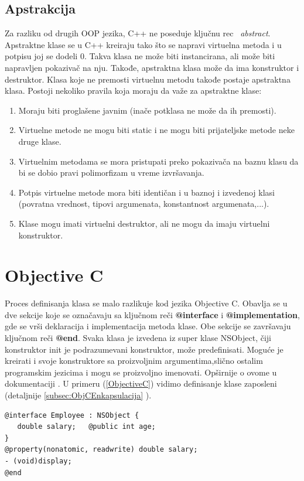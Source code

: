 \documentclass[a4paper]{article}
\begin{document}
{\subsection{Apstrakcija}
\label{subsec:c++Apstrakcija}
Za razliku od drugih OOP jezika, C++ ne poseduje ključnu rec ~{\em abstract}. Apstraktne klase se u C++ kreiraju tako što se napravi virtuelna metoda i u potpisu joj se dodeli 0. Takva klasa ne može biti instancirana, ali može biti napravljen pokazivač na nju. Takođe, apstraktna klasa može da ima konstruktor i destruktor. Klasa koje ne premosti virtuelnu metodu takođe postaje apstraktna klasa. Postoji nekoliko pravila koja moraju da važe za apstraktne klase:
\begin{enumerate}
	\item Moraju biti proglašene javnim (inače potklasa ne može da ih premosti).
	\item Virtuelne metode ne mogu biti static i ne mogu biti prijateljske metode neke druge klase.
	\item Virtuelnim metodama se mora pristupati preko pokazivača na baznu klasu da bi se dobio pravi polimorfizam u vreme izvršavanja.
	\item Potpis virtuelne metode mora biti identičan i u baznoj i izvedenoj klasi (povratna vrednost, tipovi argumenata, konstantnost argumenata,...).
	\item Klase mogu imati virtuelni destruktor, ali ne mogu da imaju virtuelni konstruktor.
\end{enumerate}

\section{Objective C}
\label{sec:ObjectiveC}

Proces definisanja klasa se malo razlikuje kod jezika Objective C. Obavlja se u dve sekcije koje se označavaju sa ključnom reči \textbf{@interface} i \textbf{@implementation}, gde se vrši deklaracija i implementacija metoda klase. Obe sekcije se završavaju ključnom reči \textbf{@end}. Svaka klasa je izvedena iz super klase NSObject, čiji konstruktor init je podrazumevani konstruktor, može predefinisati. Moguće je kreirati i svoje konstruktore sa proizvoljnim argumentima,slično ostalim programskim jezicima i mogu se proizvoljno imenovati. Opširnije o ovome u dokumentaciji \cite{ObjectiveCdoc}. U primeru (\ref{ObjectiveC}) vidimo definisanje klase zaposleni (detaljnije \ref{subsec:ObjCEnkapsulacija} ).

\begin{lstlisting}[caption={Primer koda u Objective C jeziku},frame=single, label=ObjectiveC]
@interface Employee : NSObject {
   double salary;	@public int age;
}
@property(nonatomic, readwrite) double salary; 
- (void)display;
@end


\end{lstlisting}}
\end{document}

